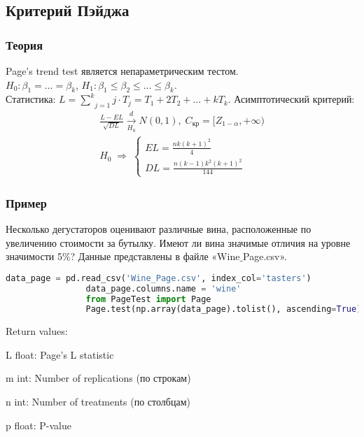 	\subsection{Критерий Пэйджа}\label{cha:uniform/sec:anov/page}

		\subsubsection*{Теория}\label{cha:uniform/sec:anov/subsec:page/subsubsec:theory}

		Page's trend test является непараметрическим тестом.\\

		$H_0: \beta_1 = \dots = \beta_k$, $H_1: \beta_1 \le \beta_2 \le \dots \le \beta_k$.\\

		Статистика: $L = \underset{j=1}{\overset{k}{\sum}}j \cdot T_j = T_1 + 2 T_2 + \dots + k T_k$.
		Асимптотический критерий:
		$$\begin{gathered}
			\frac{L - E L}{\sqrt{D L}} \xrightarrow[H_0]{d}N(0,1), \; C_{\text{кр}} = [Z_{1-\alpha}, +\infty) \\
			H_0 \; \Rightarrow \; \begin{cases}
				E L = \frac{nk (k+1)^2}{4} \\
				D L = \frac{n(k-1)k^2(k+1)^2}{144}
			\end{cases}
		\end{gathered}$$

		\subsubsection*{Пример}\label{cha:uniform/sec:anov/subsec:page/subsubsec:prob}

		\begin{problem}
			Несколько дегустаторов оценивают различные вина, расположенные по увеличению стоимости за бутылку. Имеют ли вина значимые отличия на уровне значимости 5$\%$? Данные представлены в файле «Wine$\_$Page.csv».
		\end{problem}
		\begin{solution}
			\begin{lstlisting}[language=Python]
				data_page = pd.read_csv('Wine_Page.csv', index_col='tasters') 
				data_page.columns.name = 'wine'
				from PageTest import Page
				Page.test(np.array(data_page).tolist(), ascending=True)
			\end{lstlisting}

			Return values:

			L float: Page’s L statistic

			m int: Number of replications (по строкам)

			n int: Number of treatments (по столбцам)

			p float: P-value
		\end{solution}

